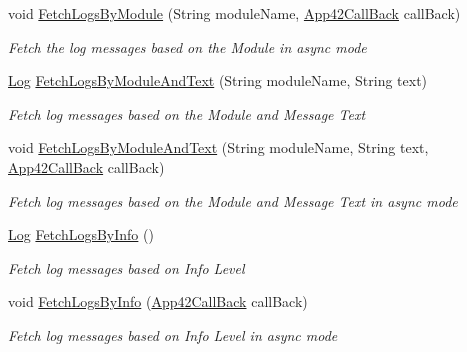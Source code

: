 \begin{DoxyCompactItemize}
void \hyperlink{classcom_1_1shephertz_1_1app42_1_1paas_1_1sdk_1_1csharp_1_1log_1_1_log_service_a4861107d7aba2236112c2b0dcd89aef8}{Fetch\+Logs\+By\+Module} (String module\+Name, \hyperlink{interfacecom_1_1shephertz_1_1app42_1_1paas_1_1sdk_1_1csharp_1_1_app42_call_back}{App42\+Call\+Back} call\+Back)
\begin{DoxyCompactList}\small\item\em Fetch the log messages based on the Module in async mode \end{DoxyCompactList}\item 
\hyperlink{classcom_1_1shephertz_1_1app42_1_1paas_1_1sdk_1_1csharp_1_1log_1_1_log}{Log} \hyperlink{classcom_1_1shephertz_1_1app42_1_1paas_1_1sdk_1_1csharp_1_1log_1_1_log_service_a6c0ecdfe9b9f01265d7d3995e27f64ef}{Fetch\+Logs\+By\+Module\+And\+Text} (String module\+Name, String text)
\begin{DoxyCompactList}\small\item\em Fetch log messages based on the Module and Message Text \end{DoxyCompactList}\item 
void \hyperlink{classcom_1_1shephertz_1_1app42_1_1paas_1_1sdk_1_1csharp_1_1log_1_1_log_service_a058d117ad1a2e3727ad467757913e806}{Fetch\+Logs\+By\+Module\+And\+Text} (String module\+Name, String text, \hyperlink{interfacecom_1_1shephertz_1_1app42_1_1paas_1_1sdk_1_1csharp_1_1_app42_call_back}{App42\+Call\+Back} call\+Back)
\begin{DoxyCompactList}\small\item\em Fetch log messages based on the Module and Message Text in async mode \end{DoxyCompactList}\item 
\hyperlink{classcom_1_1shephertz_1_1app42_1_1paas_1_1sdk_1_1csharp_1_1log_1_1_log}{Log} \hyperlink{classcom_1_1shephertz_1_1app42_1_1paas_1_1sdk_1_1csharp_1_1log_1_1_log_service_aadaff94993abf05fcf7a45fb5beb61b8}{Fetch\+Logs\+By\+Info} ()
\begin{DoxyCompactList}\small\item\em Fetch log messages based on Info Level \end{DoxyCompactList}\item 
void \hyperlink{classcom_1_1shephertz_1_1app42_1_1paas_1_1sdk_1_1csharp_1_1log_1_1_log_service_ab8b64a93c7f3238f6dccc99158799749}{Fetch\+Logs\+By\+Info} (\hyperlink{interfacecom_1_1shephertz_1_1app42_1_1paas_1_1sdk_1_1csharp_1_1_app42_call_back}{App42\+Call\+Back} call\+Back)
\begin{DoxyCompactList}\small\item\em Fetch log messages based on Info Level in async mode \end{DoxyCompactList}\item 

\end{DoxyCompactItemize}
